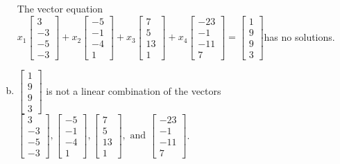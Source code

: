 \begin{exerciseAnswer}
\begin{enumerate}[(a)]
\begin{center}
\begin{minipage}{0.8\textwidth}
 The vector equation \( x_{1} \left[\begin{array}{c}
3 \\
-3 \\
-5 \\
-3
\end{array}\right] + x_{2} \left[\begin{array}{c}
-5 \\
-1 \\
-4 \\
1
\end{array}\right] + x_{3} \left[\begin{array}{c}
7 \\
5 \\
13 \\
1
\end{array}\right] + x_{4} \left[\begin{array}{c}
-23 \\
-1 \\
-11 \\
7
\end{array}\right] = \left[\begin{array}{c}
1 \\
9 \\
9 \\
3
\end{array}\right] \)has no solutions.
\end{minipage}\end{center}
    
\item 

\( \left[\begin{array}{c}
1 \\
9 \\
9 \\
3
\end{array}\right] \) is not a linear combination of the vectors \( \left[\begin{array}{c}
3 \\
-3 \\
-5 \\
-3
\end{array}\right] , \left[\begin{array}{c}
-5 \\
-1 \\
-4 \\
1
\end{array}\right] , \left[\begin{array}{c}
7 \\
5 \\
13 \\
1
\end{array}\right] , \text{ and } \left[\begin{array}{c}
-23 \\
-1 \\
-11 \\
7
\end{array}\right] \). 


\end{enumerate}
    
\end{exerciseAnswer}
    

